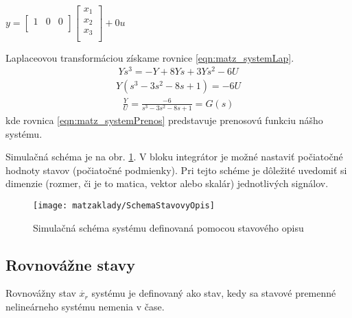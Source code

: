 \documentclass[../main.tex]{subfiles}
\begin{document}
        \begin{center}
		$y  = 
		\begin{bmatrix} 
			1 & 0 & 0 \\ 
		\end{bmatrix} 
		\begin{bmatrix} 
			x_1 \\ 
			x_2 \\ 
			x_3 \\ 
		\end{bmatrix} +
		0u $
	\label{eqn:matz_system2}
        \end{center}
Laplaceovou transformáciou získame rovnice \ref{eqn:matz_systemLap}. 
\begin{equation}
	\begin{aligned}
		Ys^3 = -Y + 8 Ys + 3Ys^2 - 6U
	\end{aligned}
	\label{eqn:matz_systemLap}
\end{equation}
\begin{equation}
	\begin{aligned}
		Y(s^3 -3s^2 -8s + 1) = - 6U
	\end{aligned}
\end{equation}
\begin{equation}
	\begin{aligned}
		\frac{Y}{U} = \frac{-6}{s^3 -3s^2 -8s + 1} = G(s)
	\end{aligned}
	\label{eqn:matz_systemPrenos}
\end{equation}
kde rovnica  \ref{eqn:matz_systemPrenos} predstavuje prenosovú funkciu nášho systému.

Simulačná schéma je na obr. \ref{fig:matz_systemStavovyOpisSimulink}. V bloku integrátor je možné nastaviť počiatočné hodnoty stavov (počiatočné podmienky). Pri tejto schéme je dôležité uvedomiť si dimenzie (rozmer, či je to matica, vektor alebo skalár) jednotlivých signálov.
\begin{figure}[h!]
	\centering
	\texttt{[image: matzaklady/SchemaStavovyOpis]}
	\caption{Simulačná schéma systému definovaná pomocou stavového opisu}
	\label{fig:matz_systemStavovyOpisSimulink}
\end{figure}

\subsection{Rovnovážne stavy}
Rovnovážny stav $\dot{x_r}$ systému je definovaný ako stav, kedy sa stavové premenné nelineárneho systému nemenia v čase. 
\end{document}
